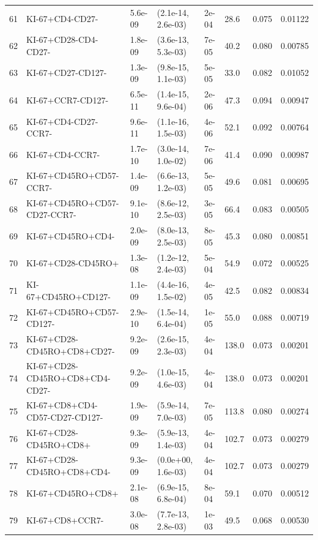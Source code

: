 \begin{landscape}
\begin{center}
{\begin{longtable}{rlllllll}
      61 & KI-67+CD4-CD27- & 5.6e-09 & (2.1e-14, 2.6e-03) & 2e-04 &  28.6 & 0.075 & 0.01122 \\ 
      62 & KI-67+CD28-CD4-CD27- & 1.8e-09 & (3.6e-13, 5.3e-03) & 7e-05 &  40.2 & 0.080 & 0.00785 \\ 
      63 & KI-67+CD27-CD127- & 1.3e-09 & (9.8e-15, 1.1e-03) & 5e-05 &  33.0 & 0.082 & 0.01052 \\ 
      64 & KI-67+CCR7-CD127- & 6.5e-11 & (1.4e-15, 9.6e-04) & 2e-06 &  47.3 & 0.094 & 0.00947 \\ 
      65 & KI-67+CD4-CD27-CCR7- & 9.6e-11 & (1.1e-16, 1.5e-03) & 4e-06 &  52.1 & 0.092 & 0.00764 \\ 
      66 & KI-67+CD4-CCR7- & 1.7e-10 & (3.0e-14, 1.0e-02) & 7e-06 &  41.4 & 0.090 & 0.00987 \\ 
      67 & KI-67+CD45RO+CD57-CCR7- & 1.4e-09 & (6.6e-13, 1.2e-03) & 5e-05 &  49.6 & 0.081 & 0.00695 \\ 
      68 & KI-67+CD45RO+CD57-CD27-CCR7- & 9.1e-10 & (8.6e-12, 2.5e-03) & 3e-05 &  66.4 & 0.083 & 0.00505 \\ 
      69 & KI-67+CD45RO+CD4- & 2.0e-09 & (8.0e-13, 2.5e-03) & 8e-05 &  45.3 & 0.080 & 0.00851 \\ 
      70 & KI-67+CD28-CD45RO+ & 1.3e-08 & (1.2e-12, 2.4e-03) & 5e-04 &  54.9 & 0.072 & 0.00525 \\ 
      71 & KI-67+CD45RO+CD127- & 1.1e-09 & (4.4e-16, 1.5e-02) & 4e-05 &  42.5 & 0.082 & 0.00834 \\ 
      72 & KI-67+CD45RO+CD57-CD127- & 2.9e-10 & (1.5e-14, 6.4e-04) & 1e-05 &  55.0 & 0.088 & 0.00719 \\ 
      73 & KI-67+CD28-CD45RO+CD8+CD27- & 9.2e-09 & (2.6e-15, 2.3e-03) & 4e-04 & 138.0 & 0.073 & 0.00201 \\ 
      74 & KI-67+CD28-CD45RO+CD8+CD4-CD27- & 9.2e-09 & (1.0e-15, 4.6e-03) & 4e-04 & 138.0 & 0.073 & 0.00201 \\ 
      75 & KI-67+CD8+CD4-CD57-CD27-CD127- & 1.9e-09 & (5.9e-14, 7.0e-03) & 7e-05 & 113.8 & 0.080 & 0.00274 \\ 
      76 & KI-67+CD28-CD45RO+CD8+ & 9.3e-09 & (5.9e-13, 1.4e-03) & 4e-04 & 102.7 & 0.073 & 0.00279 \\ 
      77 & KI-67+CD28-CD45RO+CD8+CD4- & 9.3e-09 & (0.0e+00, 1.6e-03) & 4e-04 & 102.7 & 0.073 & 0.00279 \\ 
      78 & KI-67+CD45RO+CD8+ & 2.1e-08 & (6.9e-15, 6.8e-04) & 8e-04 &  59.1 & 0.070 & 0.00512 \\ 
      79 & KI-67+CD8+CCR7- & 3.0e-08 & (7.7e-13, 2.8e-03) & 1e-03 &  49.5 & 0.068 & 0.00530 \\ 

\end{longtable}}
\end{center}
\end{landscape}
